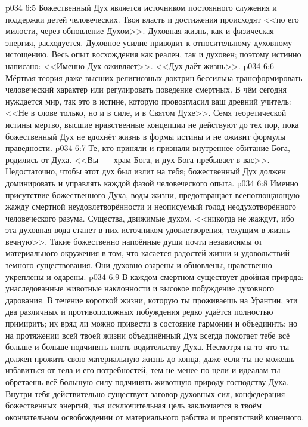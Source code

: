 \vs p034 6:5 \pc Божественный Дух является источником постоянного служения и поддержки детей человеческих. Твоя власть и достижения происходят <<по его милости, через обновление Духом>>. Духовная жизнь, как и физическая энергия, расходуется. Духовное усилие приводит к относительному духовному истощению. Весь опыт восхождения как реален, так и духовен; поэтому истинно написано: <<Именно Дух оживляет>>. <<Дух даёт жизнь>>.
\vs p034 6:6 Мёртвая теория даже высших религиозных доктрин бессильна трансформировать человеческий характер или регулировать поведение смертных. В чём сегодня нуждается мир, так это в истине, которую провозгласил ваш древний учитель: <<Не в слове только, но и в силе, и в Святом Духе>>. Семя теоретической истины мертво, высшие нравственные концепции не действуют до тех пор, пока божественный Дух не вдохнёт жизнь в формы истины и не оживит формулы праведности.
\vs p034 6:7 Те, кто приняли и признали внутреннее обитание Бога, родились от Духа. <<Вы~--- храм Бога, и дух Бога пребывает в вас>>. Недостаточно, чтобы этот дух был излит на тебя; божественный Дух должен доминировать и управлять каждой фазой человеческого опыта.
\vs p034 6:8 Именно присутствие божественного Духа, воды жизни, предотвращает всепоглощающую жажду смертной неудовлетворённости и неописуемый голод неодухотворённого человеческого разума. Существа, движимые духом, <<никогда не жаждут, ибо эта духовная вода станет в них источником удовлетворения, текущим в жизнь вечную>>. Такие божественно напоённые души почти независимы от материального окружения в том, что касается радостей жизни и удовольствий земного существования. Они духовно озарены и обновлены, нравственно укреплены и одарены.
\vs p034 6:9 \pc В каждом смертном существует двойная природа: унаследованные животные наклонности и высокое побуждение духовного дарования. В течение короткой жизни, которую ты проживаешь на Урантии, эти два различных и противоположных побуждения редко удаётся полностью примирить; их вряд ли можно привести в состояние гармонии и объединить; но на протяжении всей твоей жизни объединённый Дух всегда помогает тебе всё больше и больше подчинять плоть водительству Духа. Несмотря на то что ты должен прожить свою материальную жизнь до конца, даже если ты не можешь избавиться от тела и его потребностей, тем не менее по цели и идеалам ты обретаешь всё большую силу подчинять животную природу господству Духа. Внутри тебя действительно существует заговор духовных сил, конфедерация божественных энергий, чья исключительная цель заключается в твоём окончательном освобождении от материального рабства и препятствий конечного.
